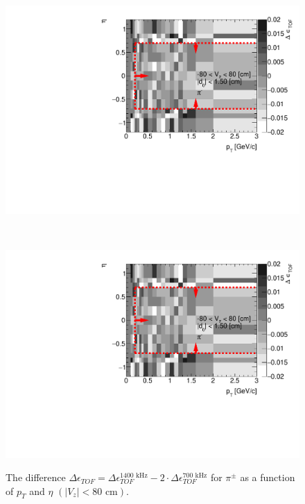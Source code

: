 \begin{figure}[H]
	\caption[The difference $\Delta\epsilon_{ TOF} =\Delta\epsilon_{ TOF}^{1400\text{ kHz}}-2\cdot\Delta\epsilon_{ TOF}^{700\text{ kHz}}$ for $\pi^\pm$ as a function of $p_T$ and $\eta$ $\left(|V_z|<80\text{ cm}\right)$]{The difference $\Delta\epsilon_{ TOF} =\Delta\epsilon_{ TOF}^{1400\text{ kHz}}-2\cdot\Delta\epsilon_{ TOF}^{700\text{ kHz}}$ for $\pi^\pm$ as a function of $p_T$ and $\eta$ $\left(|V_z|<80\text{ cm}\right)$. }
	\label{fig:systError2Dtof}
	\centering
	\parbox{0.495\textwidth}{
		\centering
		\includegraphics[width=\linewidth,page=1]{graphics/systematicsEfficiency/bbc_and/tofEffi_d0_1_5_etapt_12D.pdf}\\
	}~
	\parbox{0.495\textwidth}{
		\centering
		\includegraphics[width=\linewidth,page=2]{graphics/systematicsEfficiency/bbc_and/tofEffi_d0_1_5_etapt_12D.pdf}\\
	}%
\end{figure}




